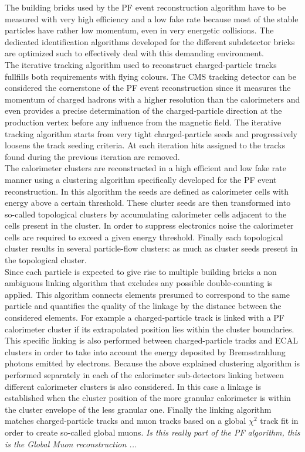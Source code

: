 The building bricks used by the PF event reconstruction algorithm have to be measured with very high efficiency and a low fake rate because most of the stable particles have rather low momentum, even in very energetic collisions.
The dedicated identification algorithms developed for the different subdetector bricks are optimized such to effectively deal with this demanding environment.
\\
The iterative tracking algorithm used to reconstruct charged-particle tracks fullfills both requirements with flying colours. The CMS tracking detector can be considered the cornerstone of the PF event reconstruction since it measures the momentum of charged hadrons with a higher resolution than the calorimeters and even provides a precise determination of the charged-particle direction at the production vertex before any influence from the magnetic field. The iterative tracking algorithm starts from very tight charged-particle seeds and progressively loosens the track seeding criteria. At each iteration hits assigned to the tracks found during the previous iteration are removed.%
\\
The calorimeter clusters are reconstructed in a high efficient and low fake rate manner using a clustering algorithm specifically developed for the PF event reconstruction. In this algorithm the seeds are defined as calorimeter cells with energy above a certain threshold. These cluster seeds are then transformed into so-called topological clusters by accumulating calorimeter cells adjacent to the cells present in the cluster. In order to suppress electronics noise the calorimeter cells are required to exceed a given energy threshold. Finally each topological cluster results in several particle-flow clusters: as much as cluster seeds present in the topological cluster.
\\

Since each particle is expected to give rise to multiple building bricks a non ambiguous linking algorithm that excludes any possible double-counting is applied. This algorithm connects elements presumed to correspond to the same particle and quantifies the quality of the linkage by the distance between the considered elements. For example a charged-particle track is linked with a PF calorimeter cluster if its extrapolated position lies within the cluster boundaries. This specific linking is also performed between charged-particle tracks and ECAL clusters in order to take into account the energy deposited by Bremsstrahlung photons emitted by electrons. Because the above explained clustering algorithm is performed separately in each of the calorimeter sub-detectors linking between different calorimeter clusters is also considered. In this case a linkage is established when the cluster position of the more granular calorimeter is within the cluster envelope of the less granular one. Finally the linking algorithm matches charged-particle tracks and muon tracks based on a global $\chi^{2}$ track fit in order to create so-called global muons. \textit{Is this really part of the PF algorithm, this is the Global Muon reconstruction ...}

